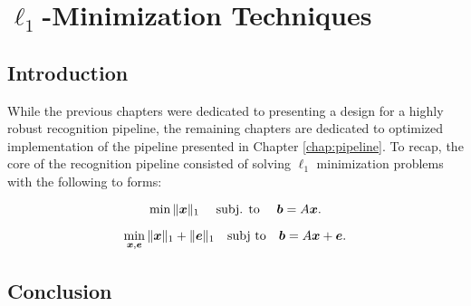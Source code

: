 \chapter{$\ell_1$-Minimization Techniques}
\label{chap:minimization}

\section{Introduction}
While the previous chapters were dedicated to presenting a design for a highly robust
recognition pipeline, the remaining chapters are dedicated to optimized implementation
of the pipeline presented in Chapter \ref{chap:pipeline}.  To recap, the core of the recognition
pipeline consisted of solving $\ell_1$ minimization problems with the following to forms:

\begin{equation} \min \|{\boldsymbol{x}}\|_1\quad \mbox{ subj. to }\quad \boldsymbol{b} = A{\boldsymbol{x}}.
\label{eq:l1min} \end{equation}

\begin{equation}
\min_{{\boldsymbol{x}}, {\boldsymbol{e}}} \| {\boldsymbol{x}} \|_1 + \|{\boldsymbol{e}}\|_1 \quad \textup{subj to} \quad \boldsymbol{b} = A {\boldsymbol{x}} + {\boldsymbol{e}}.
\label{eq:l1min_denoise}
\end{equation}





%
%

\section{Conclusion}


